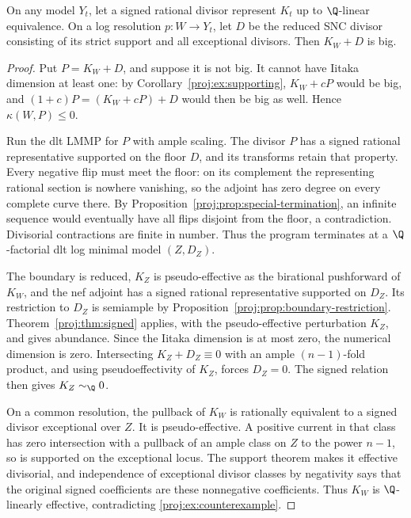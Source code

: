 \begin{proposition}\label{proj:prop:signed-alternative}
On any model \(Y_t\), let a signed rational divisor
represent \(K_t\) up to \(\Q\)-linear equivalence. On a
log resolution \(p:W\to Y_t\), let \(D\) be the reduced
SNC divisor consisting of its strict support and all
exceptional divisors. Then \(K_W+D\) is big.
\end{proposition}
\begin{proof}
Put \(P=K_W+D\), and suppose it is not big. It cannot
have Iitaka dimension at least one: by
Corollary~\ref{proj:ex:supporting}, \(K_W+cP\) would be big,
and
\((1+c)P=(K_W+cP)+D\) would then be big as well.
Hence \(\kappa(W,P)\leq0\).

Run the dlt LMMP for \(P\) with ample scaling.
The divisor \(P\) has a signed rational representative
supported on the floor \(D\), and its transforms retain
that property. Every negative flip must meet the floor:
on its complement the representing rational section is
nowhere vanishing, so the adjoint has zero degree on
every complete curve there. By
Proposition~\ref{proj:prop:special-termination}, an infinite
sequence would eventually have all flips disjoint from
the floor, a contradiction. Divisorial contractions
are finite in number. Thus the program terminates at
a \(\Q\)-factorial dlt log minimal model
\((Z,D_Z)\).

The boundary is reduced, \(K_Z\) is pseudo-effective
as the birational pushforward of \(K_W\), and the nef
adjoint has a signed rational representative supported
on \(D_Z\). Its restriction to \(D_Z\) is semiample
by Proposition~\ref{proj:prop:boundary-restriction}.
Theorem~\ref{proj:thm:signed} applies, with the
pseudo-effective perturbation \(K_Z\), and gives
abundance. Since the Iitaka dimension is at most zero,
the numerical dimension is zero. Intersecting
\(K_Z+D_Z\equiv0\) with an ample
\((n-1)\)-fold product, and using pseudoeffectivity of
\(K_Z\), forces \(D_Z=0\). The signed relation then
gives \(K_Z\sim_\Q0\).

On a common resolution, the pullback of \(K_W\) is
rationally equivalent to a signed divisor exceptional
over \(Z\). It is pseudo-effective. A positive current
in that class has zero intersection with a pullback
of an ample class on \(Z\) to the power \(n-1\),
so is supported on the exceptional locus. The support
theorem makes it effective divisorial, and independence
of exceptional divisor classes by negativity says that
the original signed coefficients are these nonnegative
coefficients. Thus \(K_W\) is \(\Q\)-linearly effective,
contradicting \eqref{proj:ex:counterexample}.
\end{proof}
